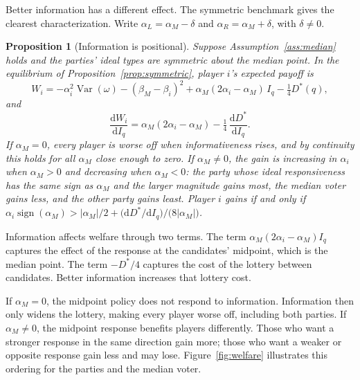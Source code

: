 \documentclass[12pt,letterpaper]{article}
\newtheorem{proposition}{Proposition}
\begin{document}
Better information has a different effect. The symmetric benchmark gives the clearest characterization. Write $\alpha_L=\alpha_M-\delta$ and $\alpha_R=\alpha_M+\delta$, with $\delta\ne0$.

\begin{proposition}[Information is positional]\label{prop:welfare}
Suppose Assumption~\ref{ass:median} holds and the parties' ideal types are symmetric about the median point. In the equilibrium of Proposition~\ref{prop:symmetric}, player $i$'s expected payoff is
\[
W_i=-\alpha_i^2\operatorname{Var}(\omega)-(\beta_M-\beta_i)^2+\alpha_M(2\alpha_i-\alpha_M)\,I_q-\tfrac14D^*(q),
\]
and
\[
\frac{\mathrm{d}W_i}{\mathrm{d}I_q}=\alpha_M(2\alpha_i-\alpha_M)-\tfrac14\,\frac{\mathrm{d}D^*}{\mathrm{d}I_q}.
\]
If $\alpha_M=0$, every player is worse off when informativeness rises, and by continuity this holds for all $\alpha_M$ close enough to zero. If $\alpha_M\ne0$, the gain is increasing in $\alpha_i$ when $\alpha_M>0$ and decreasing when $\alpha_M<0$: the party whose ideal responsiveness has the same sign as $\alpha_M$ and the larger magnitude gains most, the median voter gains less, and the other party gains least. Player $i$ gains if and only if $\alpha_i\operatorname{sign}(\alpha_M)>|\alpha_M|/2+\big(\mathrm{d}D^*/\mathrm{d}I_q\big)/\big(8|\alpha_M|\big)$.
\end{proposition}

Information affects welfare through two terms. The term $\alpha_M(2\alpha_i-\alpha_M)I_q$ captures the effect of the response at the candidates' midpoint, which is the median point. The term $-D^*/4$ captures the cost of the lottery between candidates. Better information increases that lottery cost.

If $\alpha_M=0$, the midpoint policy does not respond to information. Information then only widens the lottery, making every player worse off, including both parties. If $\alpha_M\ne0$, the midpoint response benefits players differently. Those who want a stronger response in the same direction gain more; those who want a weaker or opposite response gain less and may lose. Figure~\ref{fig:welfare} illustrates this ordering for the parties and the median voter.
\end{document}
